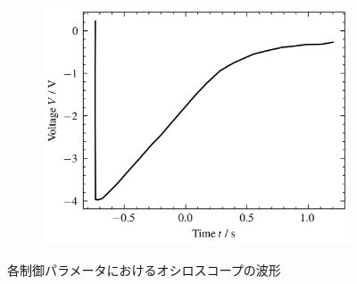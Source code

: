 \begin{figure}
\begin{subfigure}{0.48\columnwidth}
		\label{fig:oscilloscope-each-p60-d80}
	\end{subfigure}
	\begin{subfigure}{0.48\columnwidth}
		\centering
		\includegraphics[width=0.8\linewidth]{src/figures/oscilloscope-each/p60-d100-oscilloscope.csv.png}
		\label{fig:oscilloscope-each-p60-d100}
	\end{subfigure}
	\caption{各制御パラメータにおけるオシロスコープの波形}
\end{figure}

